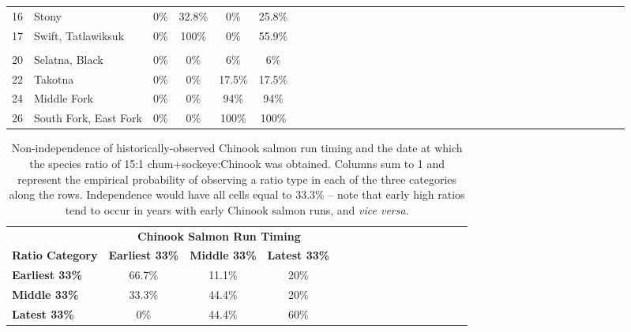 \documentclass[12pt,]{book}
\theoremstyle{definition}
\theoremstyle{definition}
\theoremstyle{definition}
\theoremstyle{remark}
\begin{document}
\begin{longtable}[t]{clccccclccccclccccclccccclccccclcccc}
\hspace{1em}16 & Stony & 0\% & 32.8\% & 0\% & 25.8\%\\
\hspace{1em}17 & Swift, Tatlawiksuk & 0\% & 100\% & 0\% & 55.9\%\\
\addlinespace[0.3em]
\hline
\multicolumn{36}{l}{\textbf{Upper River}}\\
\hline
\hspace{1em}20 & Selatna, Black & 0\% & 0\% & 6\% & 6\%\\
\hspace{1em}22 & Takotna & 0\% & 0\% & 17.5\% & 17.5\%\\
\hspace{1em}24 & Middle Fork & 0\% & 0\% & 94\% & 94\%\\
\hspace{1em}26 & South Fork, East Fork & 0\% & 0\% & 100\% & 100\%\\
\bottomrule
\end{longtable}

\clearpage

\begin{table}

\caption{\label{tab:ratio-timing-cov-table}Non-independence of historically-observed Chinook salmon run timing and the date at which the species ratio of 15:1 chum+sockeye:Chinook was obtained. Columns sum to 1 and represent the empirical probability of observing a ratio type in each of the three categories along the rows. Independence would have all cells equal to 33.3\% -- note that early high ratios tend to occur in years with early Chinook salmon runs, and \textit{vice versa}.}
\centering
\begin{tabular}[t]{>{\bfseries}lccclccclccclccc}
\toprule
\multicolumn{1}{c}{\bfseries } & \multicolumn{3}{c}{\bfseries Chinook Salmon Run Timing} \\
\cmidrule(l{2pt}r{2pt}){2-4}
\textbf{Ratio Category} & \textbf{Earliest 33\%} & \textbf{Middle 33\%} & \textbf{Latest 33\%}\\
\midrule
Earliest 33\% & 66.7\% & 11.1\% & 20\%\\
Middle 33\% & 33.3\% & 44.4\% & 20\%\\
Latest 33\% & 0\% & 44.4\% & 60\%\\
\bottomrule
\end{tabular}
\end{table}

\clearpage
\end{document}
